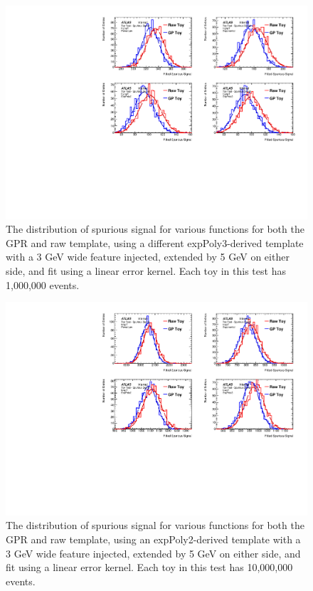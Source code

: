 \begin{figure} 
\begin{center}
  \includegraphics[width=\textwidth]{figures/background/gpr/validation/linear/ToyTest_FitSigVals_highpT_1M_Sig}   
\caption{The distribution of spurious signal for various functions for both the GPR and raw template, using a different expPoly3-derived template with a 3 GeV wide feature injected, extended by 5 GeV on either side, and fit using a linear error kernel. Each toy in this test has 1,000,000 events.}
\label{fig:linearkernel_highpt_1M_Sig}
\end{center}
\end{figure}

\begin{figure} 
\begin{center}
  \includegraphics[width=\textwidth]{figures/background/gpr/validation/linear/ToyTest_FitSigVals_lowpT_10M_Sig}   
\caption{The distribution of spurious signal for various functions for both the GPR and raw template, using an expPoly2-derived template with a 3 GeV wide feature injected, extended by 5 GeV on either side, and fit using a linear error kernel. Each toy in this test has 10,000,000 events.}
\label{fig:linearkernel_lowpt_10M_Sig}
\end{center}
\end{figure}

